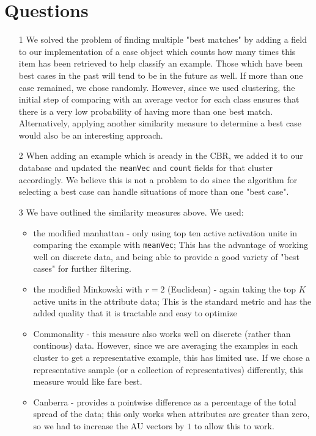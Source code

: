 \documentclass[a4paper,12pt,oneside,final]{report}
\begin{document}
\chapter{Questions}
\begin{itemize}
\item[1] We solved the problem of finding multiple "best matches" by adding a field to our implementation of a case object which counts how many times this item has been retrieved to help classify an example.  Those which have been best cases in the past will tend to be in the future as well.  If more than one case remained, we chose randomly.  However, since we used clustering, the initial step of comparing with an average vector for each class ensures that there is a very low probability of having more than one best match.  Alternatively, applying another similarity measure to determine a best case would also be an interesting approach.
\item[2]  When adding an example which is aready in the CBR, we added it to our database and updated the \verb+meanVec+ and \verb+count+ fields for that cluster accordingly.  We believe this is not a problem to do since the algorithm for selecting a best case can handle situations of more than one "best case".
\item[3]  We have outlined the similarity measures above.  We used:
\begin{itemize}
\item the modified manhattan - only using top ten active activation unite in comparing the example with \verb+meanVec+; This has the advantage of working well on discrete data, and being able to provide a good variety of "best cases" for further filtering.
\item the modified Minkowski with $r = 2$ (Euclidean) - again taking the top $K$ active units in the attribute data; This is the standard metric and has the added quality that it is tractable and easy to optimize
\item Commonality - this measure also works well on discrete (rather than continous) data.  However, since we are averaging the examples in each cluster to get a representative example, this has limited use.  If we chose a representative sample (or a collection of representatives) differently, this measure would like fare best.
\item Canberra - provides a pointwise difference as a percentage of the total spread of the data;  this only works when attributes are greater than zero, so we had to increase the AU vectors by $1$ to allow this to work.

\end{itemize}
\end{itemize}
\end{document}
